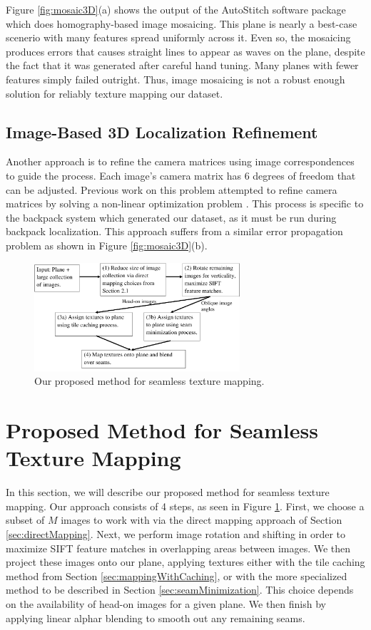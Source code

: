 \documentclass[10pt,twocolumn,letterpaper]{article}
\begin{document}
Figure \ref{fig:mosaic3D}(a) shows the output of the AutoStitch software
package which does homography-based image mosaicing. This plane is
nearly a best-case scenerio with many features spread uniformly across
it. Even so, the mosaicing produces errors that causes straight lines
to appear as waves on the plane, despite the fact that it was
generated after careful hand tuning. Many planes with fewer features
simply failed outright. Thus, image mosaicing is not a robust enough
solution for reliably texture mapping our dataset.

\subsection{Image-Based 3D Localization Refinement}
\label{sec:imageBased3DRefinement}

Another approach is to refine the camera matrices using image
correspondences to guide the process. Each image's camera matrix has 6
degrees of freedom that can be adjusted. Previous work on this problem
attempted to refine camera matrices by solving a non-linear
optimization problem \cite{liu2010indoor}. This process is specific to
the backpack system which generated our dataset, as it must be run
during backpack localization\cite{liu2010indoor,
  chen2010indoor}. This approach suffers from a similar
error propagation problem as shown in Figure \ref{fig:mosaic3D}(b).


\begin{figure}
  \centering
  \includegraphics[width=3in]{pipeline.pdf}
  \caption{Our proposed method for seamless texture mapping.}
  \label{fig:pipeline}
\end{figure}


\section{Proposed Method for Seamless Texture Mapping}
\label{sec:proposedApproach}
In this section, we will describe our proposed method for seamless
texture mapping. Our approach consists of 4 steps, as seen in Figure
\ref{fig:pipeline}.  First, we choose a subset of $M$ images to work
with via the direct mapping approach of Section
\ref{sec:directMapping}. Next, we perform image rotation and shifting
in order to maximize SIFT feature matches in overlapping areas between
images. We then project these images onto our plane, applying textures
either with the tile caching method from Section
\ref{sec:mappingWithCaching}, or with the more specialized method to
be described in Section \ref{sec:seamMinimization}. This choice
depends on the availability of head-on images for a given plane. We
then finish by applying linear alphar blending to smooth out any
remaining seams.
\end{document}
